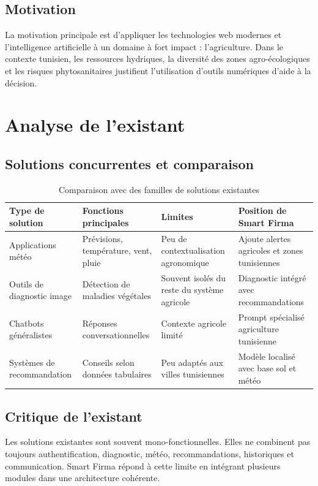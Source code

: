\subsection{Motivation}
La motivation principale est d'appliquer les technologies web modernes et l'intelligence artificielle à un domaine à fort impact : l'agriculture. Dans le contexte tunisien, les ressources hydriques, la diversité des zones agro-écologiques et les risques phytosanitaires justifient l'utilisation d'outils numériques d'aide à la décision.

\section{Analyse de l'existant}
\subsection{Solutions concurrentes et comparaison}
\begin{table}[H]
\centering
\caption{Comparaison avec des familles de solutions existantes}
\begin{tabular}{p{3.5cm}p{4.2cm}p{4.2cm}p{2.4cm}}
\toprule
\textbf{Type de solution} & \textbf{Fonctions principales} & \textbf{Limites} & \textbf{Position de Smart Firma} \\
\midrule
Applications météo & Prévisions, température, vent, pluie & Peu de contextualisation agronomique & Ajoute alertes agricoles et zones tunisiennes \\
Outils de diagnostic image & Détection de maladies végétales & Souvent isolés du reste du système agricole & Diagnostic intégré avec recommandations \\
Chatbots généralistes & Réponses conversationnelles & Contexte agricole limité & Prompt spécialisé agriculture tunisienne \\
Systèmes de recommandation & Conseils selon données tabulaires & Peu adaptés aux villes tunisiennes & Modèle localisé avec base sol et météo \\
\bottomrule
\end{tabular}
\end{table}

\subsection{Critique de l'existant}
Les solutions existantes sont souvent mono-fonctionnelles. Elles ne combinent pas toujours authentification, diagnostic, météo, recommandations, historiques et communication. Smart Firma répond à cette limite en intégrant plusieurs modules dans une architecture cohérente.

